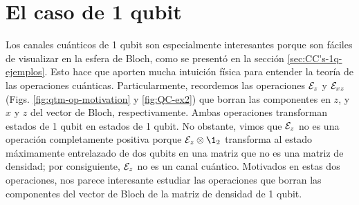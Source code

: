 \section{El caso de 1 qubit} %




Los canales cuánticos de 1 qubit son especialmente interesantes porque 
son fáciles de visualizar en la esfera de Bloch, como se presentó
en la sección \ref{sec:CC's-1q-ejemplos}. Esto hace que 
aporten mucha intuición física para entender la teoría de
las operaciones cuánticas. 
Particularmente, recordemos 
las operaciones $\mathcal{E}_z$ y $\mathcal{E}_{xz}$ (Figs. \ref{fig:qtm-op-motivation}
y \ref{fig:QC-ex2}) que borran las componentes en $z$, y 
$x$ y $z$ del vector de Bloch, respectivamente. Ambas operaciones
transforman estados de 1 qubit en estados de 1 qubit. No obstante, 
vimos que $\mathcal{E}_z$ no es una operación completamente positiva porque 
$\E_z\otimes\1 _2$ transforma al estado máximamente entrelazado de 
dos qubits en una matriz que no es una matriz de densidad;
por consiguiente, $\mathcal{E}_z$ no es un canal cuántico. 
Motivados en estas dos operaciones, nos parece interesante 
estudiar las operaciones que borran las componentes del 
vector de Bloch de la matriz de densidad de 1 qubit.

